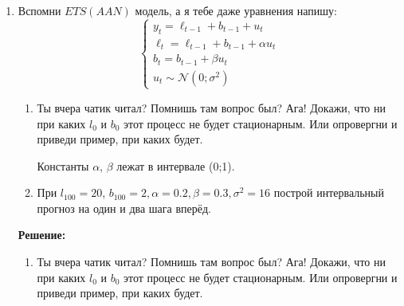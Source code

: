 \documentclass[a4paper,14pt]{article}
\begin{document}
\begin{enumerate}
Получаем, что $y_t = \alpha +0.53y_{t-1}-0.07y_{t-2}+w_t$

Так как процесс стационарен, то $\forall t: \text{E}(y_t) = const$. Отсюда найдем $\alpha$:

\begin{center}
	\begin{spacing}{1.5}
		$\text{E}(y_t) = \alpha+0.53\text{E}(y_t)-0.07\text{E}(y_t)$\\
		$\alpha = 10.8$\\
		Теперь найдем прогноз:\\
		$y_{101|100} = E(10.8+0.53y_{100}-0.07y_{99}+w_{101}|\mathcal{F}_{100})=10.8+0.53*25-0.07*22 = 22.51$\\
	\end{spacing}
\end{center}
\item Вспомни $ETS(AAN)$ модель, а я тебе даже уравнения напишу:
\begin{equation}
\begin{cases}
y_t = \ell_{t-1} + b_{t-1} + u_t \\
\ell_t = \ell_{t-1} + b_{t-1} + \alpha u_t \\
b_t = b_{t-1} + \beta u_t \\
u_t \sim \mathcal{N}(0; \sigma^2)
\end{cases}
\end{equation}
\begin{enumerate}[label=\alph*)]
    \item Ты вчера чатик читал? Помнишь там вопрос был? Ага! Докажи, что ни при каких $l_0$ и $b_0$ этот процесс не будет стационарным. Или опровергни и приведи пример, при каких будет. 
    
    Константы $\alpha$, $\beta$ лежат в интервале (0;1).
    \item При $l_{100} = 20$, $b_{100} = 2, \alpha = 0.2, \beta = 0.3, \sigma^2 = 16$ построй интервальный прогноз на один и два шага вперёд.
\end{enumerate}
\textbf{Решение:}
\begin{enumerate}[label=\alph*)]
	\item Ты вчера чатик читал? Помнишь там вопрос был? Ага! Докажи, что ни при каких $l_0$ и $b_0$ этот процесс не будет стационарным. Или опровергни и приведи пример, при каких будет. 


\end{enumerate}
\end{enumerate}
\end{document}
